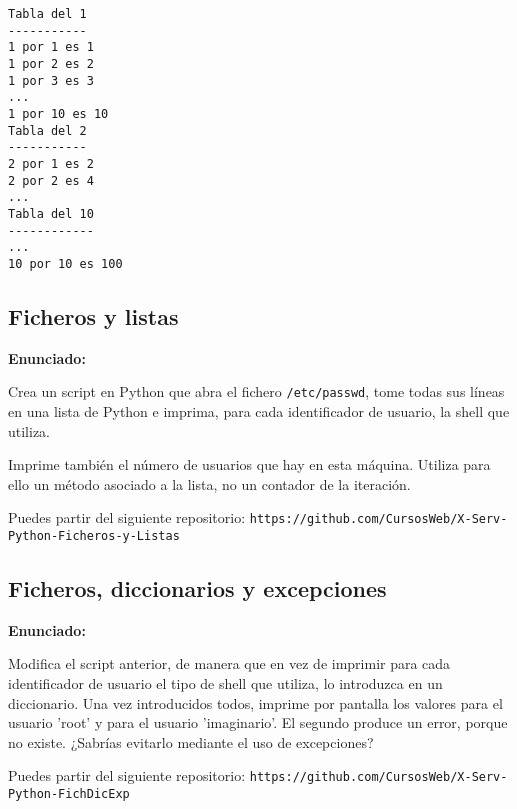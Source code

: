 \begin{verbatim}
Tabla del 1
-----------
1 por 1 es 1
1 por 2 es 2
1 por 3 es 3
...
1 por 10 es 10
Tabla del 2
-----------
2 por 1 es 2
2 por 2 es 4
...
Tabla del 10
------------
...
10 por 10 es 100
\end{verbatim}

\subsection{Ficheros y listas}
\label{subsec:ficheros-listas}

\textbf{Enunciado:}

Crea un script en Python que abra el fichero \verb|/etc/passwd|, tome todas sus líneas en una lista de Python e imprima, para cada identificador de usuario, la shell que utiliza.

Imprime también el número de usuarios que hay en esta máquina. Utiliza para
ello un método asociado a la lista, no un contador de la iteración.

Puedes partir del siguiente repositorio: \verb|https://github.com/CursosWeb/X-Serv-Python-Ficheros-y-Listas|

\subsection{Ficheros, diccionarios y excepciones}
\label{subsec:ficheros-dic-excep}

\textbf{Enunciado:}

Modifica el script
anterior, de manera que en vez de imprimir para cada identificador de usuario el tipo
de shell que utiliza, lo introduzca en un diccionario. Una vez introducidos todos, imprime por pantalla los valores para el usuario 'root' y para el
usuario 'imaginario'. El segundo produce un error, porque no existe. ¿Sabrías evitarlo mediante el uso de
excepciones?

Puedes partir del siguiente repositorio: \verb|https://github.com/CursosWeb/X-Serv-Python-FichDicExp|

